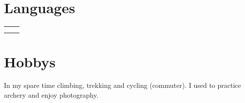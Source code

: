 \documentclass[10pt]{article} %
\begin{document}
\begin{paracol}{2}
\section{Languages}
\begin{supertabular}{rl} %
   \\
\end{supertabular}
%
\medskip %
%
%
\section{Hobbys}
In my spare time climbing, trekking and cycling (commuter). I used to practice
archery and enjoy photography.
\switchcolumn %
%
%

\end{paracol}
\end{document}
